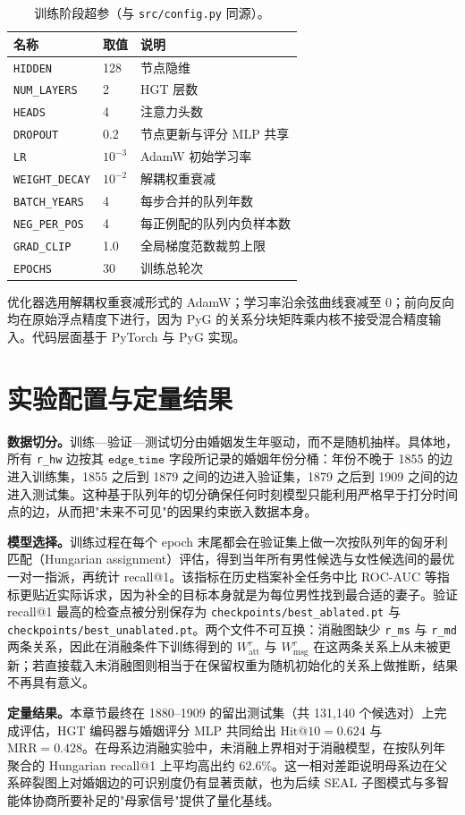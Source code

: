 \begin{table}[h]
\centering
\caption{训练阶段超参（与 \texttt{src/config.py} 同源）。}\label{tab:hyperparams}
\footnotesize
\begin{tabularx}{\linewidth}{@{}l l >{\raggedright\arraybackslash}X@{}}
\toprule
名称 & 取值 & 说明 \\
\midrule
\texttt{HIDDEN} & 128 & 节点隐维 \\
\texttt{NUM\_LAYERS} & 2 & HGT 层数 \\
\texttt{HEADS} & 4 & 注意力头数 \\
\texttt{DROPOUT} & 0.2 & 节点更新与评分 MLP 共享 \\
\texttt{LR} & \(10^{-3}\) & AdamW 初始学习率 \\
\texttt{WEIGHT\_DECAY} & \(10^{-2}\) & 解耦权重衰减 \\
\texttt{BATCH\_YEARS} & 4 & 每步合并的队列年数 \\
\texttt{NEG\_PER\_POS} & 4 & 每正例配的队列内负样本数 \\
\texttt{GRAD\_CLIP} & 1.0 & 全局梯度范数裁剪上限 \\
\texttt{EPOCHS} & 30 & 训练总轮次 \\
\bottomrule
\end{tabularx}
\end{table}

优化器选用解耦权重衰减形式的 AdamW；学习率沿余弦曲线衰减至 0；前向反向均在原始浮点精度下进行，因为 PyG 的关系分块矩阵乘内核不接受混合精度输入。代码层面基于 PyTorch\citep{paszke2019pytorch} 与 PyG\citep{fey2019pyg} 实现。

\section{实验配置与定量结果}\label{sec:hgt-eval}

\textbf{数据切分。}训练—验证—测试切分由婚姻发生年驱动，而不是随机抽样。具体地，所有 \texttt{r\_hw} 边按其 \(\texttt{edge\_time}\) 字段所记录的婚姻年份分桶：年份不晚于 1855 的边进入训练集，1855 之后到 1879 之间的边进入验证集，1879 之后到 1909 之间的边进入测试集。这种基于队列年的切分确保任何时刻模型只能利用严格早于打分时间点的边，从而把"未来不可见"的因果约束嵌入数据本身。

\textbf{模型选择。}训练过程在每个 epoch 末尾都会在验证集上做一次按队列年的匈牙利匹配（Hungarian assignment）评估，得到当年所有男性候选与女性候选间的最优一对一指派，再统计 recall@1。该指标在历史档案补全任务中比 ROC-AUC 等指标更贴近实际诉求，因为补全的目标本身就是为每位男性找到最合适的妻子。验证 recall@1 最高的检查点被分别保存为 \texttt{checkpoints/best\_ablated.pt} 与 \texttt{checkpoints/best\_unablated.pt}。两个文件不可互换：消融图缺少 \texttt{r\_ms} 与 \texttt{r\_md} 两条关系，因此在消融条件下训练得到的 \(W^{r}_{\mathrm{att}}\) 与 \(W^{r}_{\mathrm{msg}}\) 在这两条关系上从未被更新；若直接载入未消融图则相当于在保留权重为随机初始化的关系上做推断，结果不再具有意义。

\textbf{定量结果。}本章节最终在 1880--1909 的留出测试集（共 131{,}140 个候选对）上完成评估，HGT 编码器与婚姻评分 MLP 共同给出 \(\mathrm{Hit@10}=0.624\) 与 \(\mathrm{MRR}=0.428\)。在母系边消融实验中，未消融上界相对于消融模型，在按队列年聚合的 Hungarian recall@1 上平均高出约 \(62.6\%\)。这一相对差距说明母系边在父系碎裂图上对婚姻边的可识别度仍有显著贡献，也为后续 SEAL 子图模式与多智能体协商所要补足的"母家信号"提供了量化基线。

